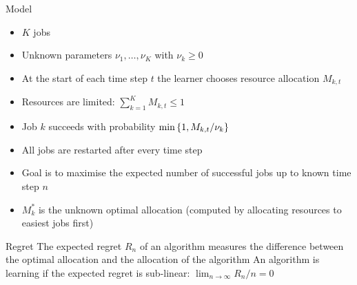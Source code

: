 \documentclass[nofooter,scale=1.4]{poster}
\begin{document}
\begin{frame}
\begin{textblock}{25.33}
\begin{block}{Model}
\begin{itemize}
\item $K$ jobs 
\item Unknown parameters $\nu_1,\ldots,\nu_K$ with $\nu_k \geq 0$
\item At the start of each time step $t$ the learner chooses resource allocation $M_{k,t}$
\item Resources are limited: $\sum_{k=1}^K M_{k,t} \leq 1$
\item Job $k$ succeeds with probability $\min\left\{1, M_{k,t} / \nu_k\right\}$
\end{itemize}
\vspace{0.5cm}
\begin{itemize}
\item All jobs are restarted after every time step
\item Goal is to maximise the expected number of successful jobs up to known time step $n$
\item $M^*_k$ is the unknown optimal allocation (computed by allocating resources to easiest jobs first)
\end{itemize}
\end{block}


\begin{block}{Regret}
\justifying
The expected regret $R_n$ of an algorithm measures the difference between the optimal allocation and the allocation of the algorithm
\eq{
\E\left[\sum_{t=1}^n \sum_{k=1}^K \left( \min\set{1, {M^*_k \over \nu_k}} - \min\set{1, {M_{k,t} \over \nu_k}}\right)\right]
}
An algorithm is learning if the expected regret is sub-linear: $\lim_{n\to\infty} R_n / n = 0$ \\[1cm]


\end{block}
\end{textblock}
\end{frame}
\end{document}
